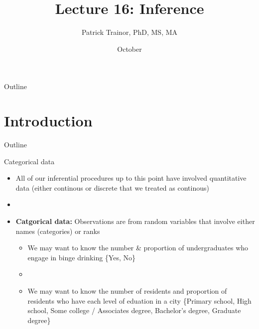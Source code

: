 \documentclass[xcolor=dvipsnames]{beamer}
\title[Lecture 16]{Lecture 16: Inference}
\author[Patrick Trainor]{Patrick Trainor, PhD, MS, MA}
\institute[NMSU]{New Mexico State University}
\date{October}
\begin{document}
	
\begin{frame}
	\maketitle
\end{frame}

\begin{frame}{Outline}
	\tableofcontents[hideallsubsections]
\end{frame}

\section{Introduction}

\begin{frame}{Outline}
	\tableofcontents[currentsection,subsectionstyle=show/shaded/hide]
\end{frame}

\begin{frame}{Categorical data}
	\begin{itemize}
		\item All of our inferential procedures up to this point have involved quantitative data (either continous or discrete that we treated as continous)
		\item[]
		\item \textbf{Catgorical data:} Observations are from random variables that involve either names (categories) or ranks
		\begin{itemize}
			\item We may want to know the number \& proportion of undergraduates who engage in binge drinking \{Yes, No\}
			\item[]
			\item We may want to know the number of residents and proportion of residents who have each level of eduation in a city \{Primary school, High school, Some college / Associates degree, Bachelor's degree, Graduate degree\}
		\end{itemize}
	\end{itemize}
\end{frame}
\end{document}

